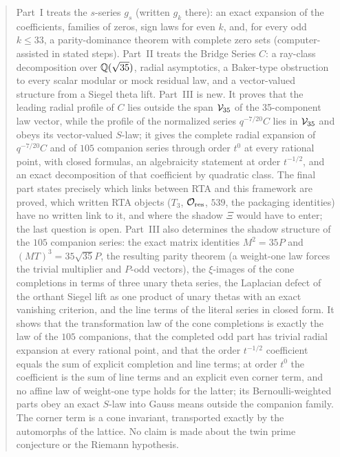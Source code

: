 \begin{abstract}
Part~I treats the $s$-series $g_s$ (written $g_k$ there): an exact expansion of the coefficients, families of zeros, sign laws for even $k$,
and, for every odd $k\le33$, a parity-dominance theorem with complete zero sets (computer-assisted in stated steps). Part~II treats the Bridge
Series $C$: a ray-class decomposition over $\Q(\sqrt{35})$, radial asymptotics, a Baker-type obstruction to every scalar modular or mock residual law,
and a vector-valued structure from a Siegel theta lift. Part~III is new. It proves that the leading radial profile of $C$ lies outside the span
$\VV$ of the 35-component law vector, while the profile of the normalized series $q^{-7/20}C$ lies in $\VV$ and obeys its vector-valued
$S$-law; it gives the complete radial expansion of $q^{-7/20}C$ and of $105$ companion series through order $t^0$ at every rational point,
with closed formulas, an algebraicity statement at order $t^{-1/2}$, and an exact decomposition of that coefficient by quadratic class.
The final part states precisely which links between RTA and this framework are proved, which written RTA objects ($T_3$, $\mathcal O_{\rm res}$,
$539$, the packaging identities) have no written link to it, and where the shadow $\Xi$ would have to enter; the last question is open.
Part~III also determines the shadow structure of the $105$ companion series: the exact matrix identities $M^2=35P$ and $(MT)^3=35\sqrt{35}P$, the resulting parity
theorem (a weight-one law forces the trivial multiplier and $P$-odd vectors), the $\xi$-images of the cone completions in terms of three unary theta series, the Laplacian
defect of the orthant Siegel lift as one product of unary thetas with an exact vanishing criterion, and the line terms of the literal series in closed form. It shows that the transformation law of the cone completions is exactly the law of the $105$ companions, that the completed odd part has trivial radial expansion at every rational point, and that the order $t^{-1/2}$ coefficient equals the sum of explicit completion and line terms; at order $t^0$ the coefficient is the sum of line terms and an explicit even corner term, and no affine law of weight-one type holds for the latter; its Bernoulli-weighted parts obey an exact $S$-law into Gauss means outside the companion family. The corner term is a cone invariant, transported exactly by the automorphs of the lattice.
No claim is made about the twin prime conjecture or the Riemann hypothesis.
\end{abstract}
\tableofcontents
\clearpage


